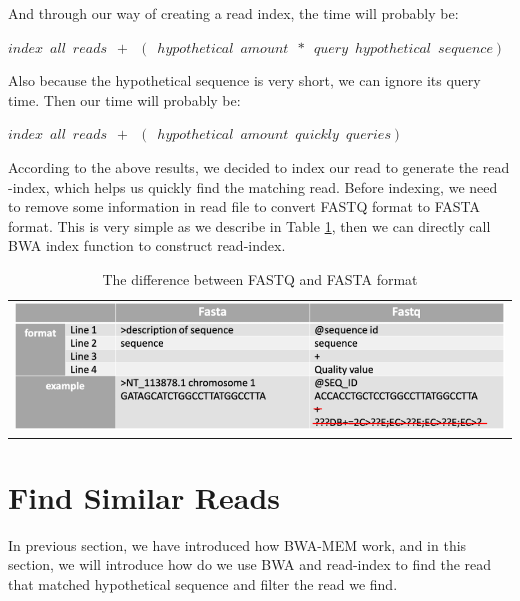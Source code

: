 \begin{flushleft}
And through our way of creating a read index, the time will probably be:
\end{flushleft}
\begin{center}
    $index\enspace all\enspace reads\enspace+\enspace(\enspace hypothetical\enspace amount\enspace*\enspace query\enspace hypothetical\enspace sequence)$
\end{center}  
\begin{flushleft}
Also because the hypothetical sequence is very short, we can ignore its query time. Then our time will probably be:
\end{flushleft}
\begin{center}
    $index\enspace all\enspace reads\enspace+\enspace(\enspace hypothetical\enspace amount\enspace quickly\enspace queries)$
\end{center}  

According to the above results, we decided to index our read to generate the read -index, which helps us quickly find the matching read. Before indexing, we need to remove some information in read file to convert FASTQ format to FASTA format. This is very simple as we describe in Table \ref{t3-1}, then we can directly call BWA index function to construct read-index.

\vspace{1cm}
\begin{table}[h]
    \centering
    \caption{The difference between FASTQ and FASTA format}
    \vspace{-0.5cm}
    \begin{tabular}{c}
        \includegraphics[width=1\textwidth]{body/image/t3-1.png}
    \end{tabular}
    \label{t3-1}
\end{table}

\section{Find Similar Reads}
In previous section, we have introduced how BWA-MEM work, and in this section, we will introduce how do we use BWA and read-index to find the read that matched hypothetical sequence and filter the read we find.


